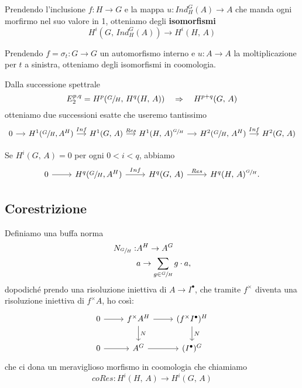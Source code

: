 \documentclass[a4paper]{article}
\begin{document}
	\begin{theorem}
		Prendendo l'inclusione $ f \colon H \to G $ e la mappa $ u \colon Ind_H^G(A) \to A $ che manda ogni morfirmo nel suo valore in 1, otteniamo degli \textbf{isomorfismi} \[ H^i(G, \, Ind_H^G(A)) \to H^i(H, \, A) \]
	\end{theorem}

	\begin{theorem}
		Prendendo $ f = \sigma_t \colon G \to G $ un automorfismo interno e $ u \colon A \to A $ la moltiplicazione per $ t $ a sinistra, otteniamo degli isomorfismi in coomologia.
	\end{theorem}

	\begin{theorem}
		Dalla successione spettrale \[ E^{p, q}_2 = H^p(\sfrac{G}{H}, \, H^q(H, \, A)) \quad\Rightarrow\quad H^{p+q}(G,\, A) \] otteniamo due successioni esatte che useremo tantissimo
		\[ \begin{tikzcd}[column sep = small]
		0 \rar & H^1(\sfrac{G}{H}, A^H) \rar["Inf"] & H^1(G, \, A) \rar["Res"] & H^1(H, \, A)^{\sfrac{G}{H}} \rar & H^2(\sfrac{G}{H}, \, A^H) \rar["Inf"] & H^2(G, \, A)
		\end{tikzcd} \]
	\end{theorem}

	\begin{theorem}
		Se $ H^i(G, \, A) = 0 $ per ogni $ 0 < i < q $, abbiamo
		\[\begin{tikzcd}
		0 \rar & H^q(\sfrac{G}{H}, A^H) \rar["Inf"] & H^q(G, \, A) \rar["Res"] & H^q(H, \, A)^{\sfrac{G}{H}}.
		\end{tikzcd} \]
	\end{theorem}
	
	\subsection{Corestrizione}
	Definiamo una buffa norma
	\begin{align*}
		N_{\sfrac{G}{H}} : & A^H \to A^G \\
		& a \to \sum_{g \in \sfrac{G}{H} } g\cdot a,
	\end{align*}
	dopodiché prendo una risoluzione iniettiva di $ A \to I^\bullet $, che tramite $ f^\times $ diventa una risoluzione iniettiva di $ f^\times A $, ho così:
	\[ \begin{tikzcd}
	0 \rar & f^\times A^H \rar \dar["N"] & (f^\times I^\bullet) ^H \dar["N"] \\
	0 \rar & A^G \rar & (I^\bullet)^G
	\end{tikzcd} \]
	che ci dona un meraviglioso morfismo in coomologia che chiamiamo
	\[ coRes \colon H^i(H,\, A) \to H^i(G, \, A)  \]
	
\end{document}
